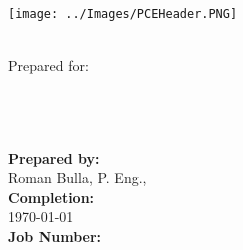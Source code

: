 \begin{titlepage}
\thispagestyle{empty}
\center %

\begin{center}
\texttt{[image: ../Images/PCEHeader.PNG]}
\end{center}

\begin{center}
\vspace{20mm}
\Huge \DocTitle \\ %
\vspace{75mm}
\large Prepared for: \\
\LARGE\textbf{\Customer} \\
\large\textbf{\Target}\\
\small\textbf{\Address}\\
\end{center}



 
\begin{flushleft} \large
\vfill

\textbf{Prepared by:} \\
Roman Bulla, P. Eng., \PCERep \\
\vspace{12pt} 
\textbf{Completion:}\\
\today \\ 
\vspace{12pt} 
\textbf{Job Number:}\\
\JobNum \\
\end{flushleft}

\end{titlepage}
